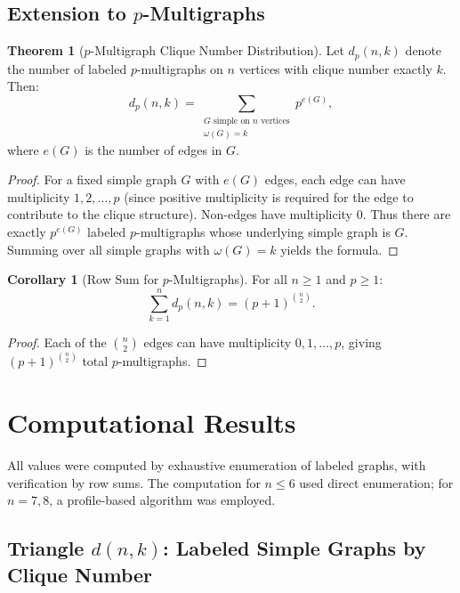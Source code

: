 \documentclass[11pt,a4paper]{article}
\theoremstyle{definition}
\newtheorem{theorem}{Theorem}[section]
\newtheorem{corollary}{Corollary}[section]
\begin{document}
\subsection{Extension to $p$-Multigraphs}

\begin{theorem}[$p$-Multigraph Clique Number Distribution]
Let $d_p(n, k)$ denote the number of labeled $p$-multigraphs on $n$ vertices with clique number exactly $k$. Then:
\[
d_p(n, k) = \sum_{\substack{G \text{ simple on } n \text{ vertices} \\ \omega(G) = k}} p^{e(G)},
\]
where $e(G)$ is the number of edges in $G$.
\end{theorem}

\begin{proof}
For a fixed simple graph $G$ with $e(G)$ edges, each edge can have multiplicity $1, 2, \ldots, p$ (since positive multiplicity is required for the edge to contribute to the clique structure). Non-edges have multiplicity 0. Thus there are exactly $p^{e(G)}$ labeled $p$-multigraphs whose underlying simple graph is $G$. Summing over all simple graphs with $\omega(G) = k$ yields the formula.
\end{proof}

\begin{corollary}[Row Sum for $p$-Multigraphs]
For all $n \geq 1$ and $p \geq 1$:
\[
\sum_{k=1}^{n} d_p(n, k) = (p+1)^{\binom{n}{2}}.
\]
\end{corollary}

\begin{proof}
Each of the $\binom{n}{2}$ edges can have multiplicity $0, 1, \ldots, p$, giving $(p+1)^{\binom{n}{2}}$ total $p$-multigraphs.
\end{proof}

\section{Computational Results}

All values were computed by exhaustive enumeration of labeled graphs, with verification by row sums. The computation for $n \leq 6$ used direct enumeration; for $n = 7, 8$, a profile-based algorithm was employed.

\subsection{Triangle $d(n, k)$: Labeled Simple Graphs by Clique Number}
\end{document}
